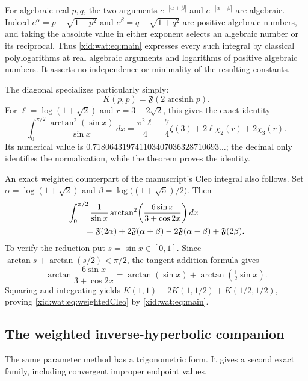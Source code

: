 \documentclass[11pt,a4paper]{article}
\numberwithin{equation}{section}
\theoremstyle{definition}
\theoremstyle{remark}
\begin{document}
For algebraic real $p,q$, the two arguments
$e^{-|\alpha+\beta|}$ and $e^{-|\alpha-\beta|}$ are algebraic.
Indeed $e^\alpha=p+\sqrt{1+p^2}$ and
$e^\beta=q+\sqrt{1+q^2}$ are positive algebraic numbers, and taking
the absolute value in either exponent selects an algebraic number
or its reciprocal. Thus \eqref{xid:wat:eq:main} expresses every such
integral by classical polylogarithms at real algebraic arguments and
logarithms of positive algebraic numbers. It asserts no independence
or minimality of the resulting constants.

The diagonal specializes particularly simply:
\begin{equation}\label{xid:wat:eq:Kdiagonal}
 K(p,p)=\mathfrak F(2\operatorname{arcsinh}p).
\end{equation}
For $\ell=\log(1+\sqrt2)$ and $r=3-2\sqrt2$, this gives the exact
identity
\begin{equation}\label{xid:wat:eq:K11}
 \boxed{\displaystyle
 \int_0^{\pi/2}\frac{\arctan^2(\sin x)}{\sin x}\,dx
 =\frac{\pi^2\ell}{4}-\frac74\zeta(3)
       +2\ell\chi_2(r)+2\chi_3(r).}
\end{equation}
Its numerical value is
$0.718064319741103407036328710693\ldots$; the decimal only
identifies the normalization, while the theorem proves the identity.

An exact weighted counterpart of the manuscript's Cleo integral
also follows. Set $\alpha=\log(1+\sqrt2)$ and
$\beta=\log\bigl((1+\sqrt5)/2\bigr)$. Then
\begin{align}\label{xid:wat:eq:weightedCleo}
 &\int_0^{\pi/2}\frac1{\sin x}
    \arctan^2\!\left(\frac{6\sin x}{3+\cos2x}\right)dx\notag\\
 &\qquad=\mathfrak F(2\alpha)
          +2\mathfrak F(\alpha+\beta)
          -2\mathfrak F(\alpha-\beta)
          +\mathfrak F(2\beta).
\end{align}
To verify the reduction put $s=\sin x\in[0,1]$. Since
$\arctan s+\arctan(s/2)<\pi/2$, the tangent addition formula gives
\[
 \arctan\frac{6\sin x}{3+\cos2x}
       =\arctan(\sin x)+\arctan(\tfrac12\sin x).
\]
Squaring and integrating yields
$K(1,1)+2K(1,1/2)+K(1/2,1/2)$, proving
\eqref{xid:wat:eq:weightedCleo} by \eqref{xid:wat:eq:main}.

\subsection{The weighted inverse-hyperbolic companion}

The same parameter method has a trigonometric form. It gives a
second exact family, including convergent improper endpoint values.
\end{document}

